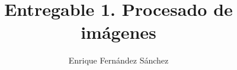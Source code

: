 \documentclass[12pt]{article}
\begin{document}
	\title{Entregable 1. Procesado de imágenes}
	\author{Enrique Fernández Sánchez}
	
	\maketitle
	
	\pagebreak
\end{document}
